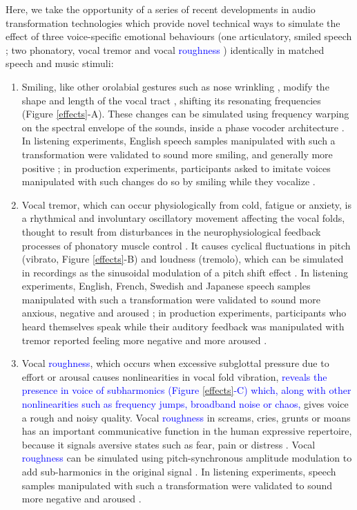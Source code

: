 \documentclass[openacc]{rsprocb_new}%
\begin{document}
Here, we take the opportunity of a series of recent developments in audio transformation technologies \cite{ARI20} which provide novel technical ways to simulate the effect of three voice-specific emotional behaviours (one articulatory, smiled speech \cite{ARI18}; two phonatory, vocal tremor \cite{RACH17} and vocal \textcolor{blue}{roughness} \cite{LIU20}) identically in matched speech and music stimuli: 
\begin{enumerate}
    \item Smiling, like other orolabial gestures such as nose wrinkling \cite{CHO18}, modify the shape and length of the vocal tract \cite{OHA80}, shifting its resonating frequencies (Figure \ref{effects}-A). These changes can be simulated using frequency warping on the spectral envelope of the sounds, inside a phase vocoder architecture \cite{ARI18}. In listening experiments, English speech samples manipulated with such a transformation were validated to sound more smiling, and generally more positive \cite{ARI18,ARI18-2}; in production experiments, participants asked to imitate voices manipulated with such changes do so by smiling while they vocalize \cite{ARI18-2}. 
    
    \item Vocal tremor, which can occur physiologically from cold, fatigue or anxiety, is a rhythmical and involuntary oscillatory movement affecting the vocal folds, thought to result from disturbances in the neurophysiological feedback processes of phonatory muscle control \cite{GID13,MOSH18}. It causes cyclical fluctuations in pitch (vibrato, Figure \ref{effects}-B) and loudness (tremolo), which can be simulated in recordings as the sinusoidal modulation of a pitch shift effect \cite{RACH17}. In listening experiments, English, French, Swedish and Japanese speech samples manipulated with such a transformation were validated to sound more anxious, negative and aroused \cite{AUC16,RACH17}; in production experiments, participants who heard themselves speak while their auditory feedback was manipulated with tremor reported feeling more negative and more aroused \cite{AUC16}. 
    
    \item Vocal \textcolor{blue}{roughness}, which occurs when excessive subglottal pressure due to effort or arousal causes nonlinearities in vocal fold vibration, \textcolor{blue}{reveals the presence in voice of subharmonics (Figure \ref{effects}-C) which, along with other nonlinearities such as frequency jumps, broadband noise or chaos,} gives voice a rough and noisy quality\cite{FIT02}. Vocal \textcolor{blue}{roughness} in screams, cries, grunts or moans has an important communicative function in the human expressive repertoire, because it signals aversive states such as fear, pain or distress \cite{ARN15,ANI20}. Vocal \textcolor{blue}{roughness} can be simulated using pitch-synchronous amplitude modulation to add sub-harmonics in the original signal \cite{LIU20}. In listening experiments, speech samples manipulated with such a transformation were validated to sound more negative and aroused \cite{LIU20}.
\end{enumerate}
\end{document}
